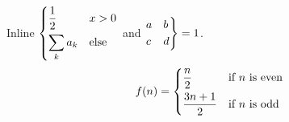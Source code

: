 \documentclass[12pt]{article}
\begin{document}
Inline $\begin{dcases} \frac{1}{2} & x > 0 \\ \sum_k a_k & \text{else} \end{dcases}$ and $\begin{rcases} a & b \\ c & d \end{rcases} = 1$.
\[ f(n) = \begin{dcases} \frac{n}{2} & \text{if $n$ is even} \\ \frac{3n+1}{2} & \text{if $n$ is odd} \end{dcases} \]
\end{document}
